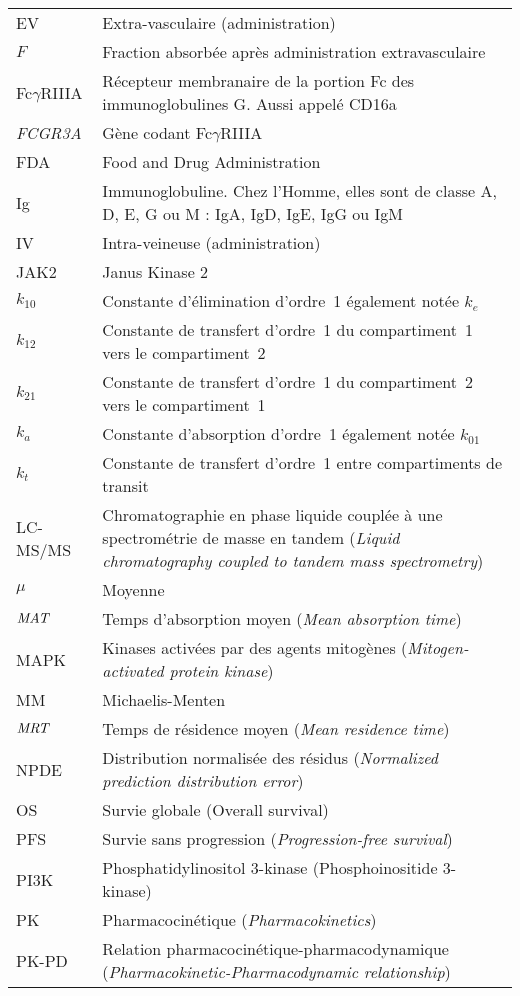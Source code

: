 \begin{tabularx}{30em}{X X}
EV & 	Extra-vasculaire (administration)\\
$F$ & 	Fraction absorbée après administration extravasculaire\\
Fc$\gamma$RIIIA & 	Récepteur membranaire de la portion Fc des immunoglobulines G. Aussi appelé CD16a\\
\textit{FCGR3A} & 	Gène codant Fc$\gamma$RIIIA\\
FDA & 	Food and Drug Administration\\
Ig & 	Immunoglobuline. Chez l'Homme, elles sont de classe A, D, E, G ou M : IgA, IgD, IgE, IgG ou IgM \\
IV & 	Intra-veineuse (administration)\\
JAK2 & 	Janus Kinase 2\\
$k_{10}$ & 	Constante d'élimination d'ordre~1 également notée $k_e$\\
$k_{12}$ & 	Constante de transfert d'ordre~1 du compartiment~1 vers le compartiment~2\\
$k_{21}$ & 	Constante de transfert d'ordre~1 du compartiment~2 vers le compartiment~1\\
$k_a$ & 	Constante d'absorption d'ordre~1 également notée $k_{01}$\\
$k_t$ & 	Constante de transfert d'ordre~1 entre compartiments de transit\\
LC-MS/MS & 	Chromatographie en phase liquide couplée à une spectrométrie de masse en tandem (\textit{Liquid chromatography coupled to tandem mass spectrometry})\\
$\mu$ & 	Moyenne\\
$\operatorname{\textit{MAT}}$ & 	Temps d'absorption moyen (\textit{Mean absorption time})\\
MAPK & 	Kinases activées par des agents mitogènes (\textit{Mitogen-activated protein kinase})\\
MM & 	Michaelis-Menten\\
$\operatorname{\textit{MRT}}$ & 	Temps de résidence moyen (\textit{Mean residence time})\\
NPDE & 	Distribution normalisée des résidus (\textit{Normalized prediction distribution error})\\
OS & 	Survie globale (Overall survival)\\
PFS & 	Survie sans progression (\textit{Progression-free survival})\\
PI3K & 	Phosphatidylinositol 3-kinase (Phosphoinositide 3-kinase)\\
PK & 	Pharmacocinétique (\textit{Pharmacokinetics})\\
PK-PD & 	Relation pharmacocinétique-pharmacodynamique (\textit{Pharmacokinetic-Pharmacodynamic relationship})\\

\end{tabularx}
